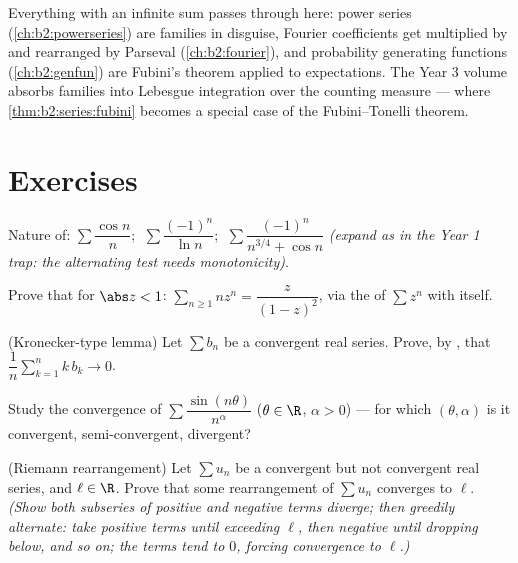 \begin{remark}
Everything with an infinite sum passes through here: power series
(\cref{ch:b2:powerseries}) are  families in disguise,
Fourier coefficients get multiplied by  and
rearranged by Parseval (\cref{ch:b2:fourier}), and probability
generating functions (\cref{ch:b2:genfun}) are Fubini's theorem
applied to expectations. The Year 3 volume absorbs 
families into Lebesgue integration over the counting measure ---
where \cref{thm:b2:series:fubini} becomes a special case of the
Fubini--Tonelli theorem.
\end{remark}

\section{Exercises}

\begin{exercise}[$\star$]\label{exo:b2:series:1}
Nature of: $\sum \dfrac{\cos n}{n}$; $\;\sum \dfrac{(-1)^n}{\ln
n}$; $\;\sum \dfrac{(-1)^n}{n^{3/4} + \cos n}$ \emph{(expand as in
the Year 1 trap: the alternating test needs monotonicity)}.
\end{exercise}

\begin{exercise}[$\star$]\label{exo:b2:series:2}
Prove that for $\abs z < 1$: $\sum_{n\geq1} n z^{n} =
\dfrac{z}{(1-z)^2}$, via the  of $\sum z^n$ with
itself.
\end{exercise}

\begin{exercise}[$\star\star$]\label{exo:b2:series:3}
(Kronecker-type lemma) Let $\sum b_n$ be a convergent real series.
Prove, by , that $\dfrac{1}{n}\sum_{k=1}^{n} k\,b_k
\to 0$.
\end{exercise}

\begin{exercise}[$\star\star$]\label{exo:b2:series:4}
Study the convergence of $\sum \dfrac{\sin(n\theta)}{n^\alpha}$
($\theta \in \R$, $\alpha > 0$) --- for which $(\theta, \alpha)$ is
it  convergent, semi-convergent, divergent?
\end{exercise}

\begin{exercise}[$\star\star\star$]\label{exo:b2:series:5}
(Riemann rearrangement) Let $\sum u_n$ be a convergent but not
 convergent real series, and $\ell \in \R$. Prove that
some rearrangement of $\sum u_n$ converges to $\ell$.
\emph{(Show both subseries of positive and negative terms diverge;
then greedily alternate: take positive terms until exceeding
$\ell$, then negative until dropping below, and so on; the terms
tend to $0$, forcing convergence to $\ell$.)}
\end{exercise}

